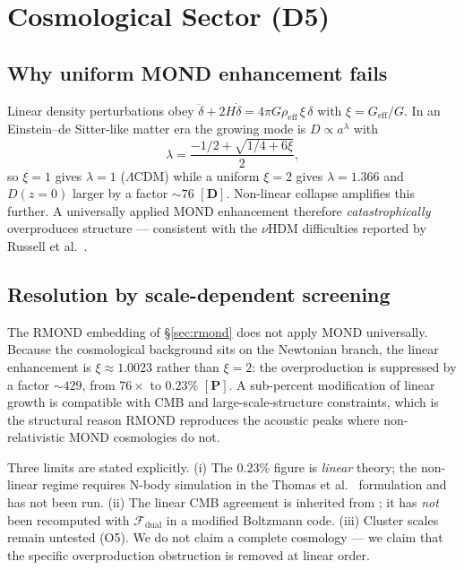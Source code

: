 \documentclass[aps,prd,preprint,superscriptaddress,nofootinbib,amsmath,amssymb,floatfix]{revtex4-2}
\makeatletter
\DeclareRobustCommand{\_}{%
    \ifmmode\nfss@text{\textunderscore}\else\textunderscore\penalty\z@\fi}%
\makeatother
\begin{document}
\section{Cosmological Sector (D5)}
\label{sec:cosmo}

\subsection{Why uniform MOND enhancement fails}

Linear density perturbations obey $\ddot\delta + 2H\dot\delta = 4\pi G\rho_{\text{eff}}\,\xi\,\delta$ with $\xi = G_{\text{eff}}/G$. In an Einstein--de Sitter-like matter era the growing mode is $D\propto a^\lambda$ with
\begin{equation}
\lambda = \frac{-1/2 + \sqrt{1/4 + 6\xi}}{2},
\end{equation}
so $\xi=1$ gives $\lambda=1$ ($\Lambda$CDM) while a uniform $\xi=2$ gives $\lambda=1.366$ and $D(z=0)$ larger by a factor $\sim76$ $\mathbf{[D]}$. Non-linear collapse amplifies this further. A universally applied MOND enhancement therefore \emph{catastrophically} overproduces structure --- consistent with the $\nu$HDM difficulties reported by Russell et al.~\cite{Russell2026}.

\subsection{Resolution by scale-dependent screening}

The RMOND embedding of \S\ref{sec:rmond} does not apply MOND universally. Because the cosmological background sits on the Newtonian branch, the linear enhancement is $\xi \approx 1.0023$ rather than $\xi = 2$: the overproduction is suppressed by a factor $\sim429$, from $76\times$ to $0.23\%$ $\mathbf{[P]}$. A sub-percent modification of linear growth is compatible with CMB and large-scale-structure constraints, which is the structural reason RMOND reproduces the acoustic peaks where non-relativistic MOND cosmologies do not.

\begin{tcolorbox}[colback=boxbg,colframe=primary,title=\textbf{Limits of this result $\mathbf{[O]}$}]
Three limits are stated explicitly. (i) The $0.23\%$ figure is \emph{linear} theory; the non-linear regime requires N-body simulation in the Thomas et al.~\cite{Thomas2023} formulation and has not been run. (ii) The linear CMB agreement is inherited from \cite{SkordisZlosnik2021}; it has \emph{not} been recomputed with $\mathcal{F}_{\text{dual}}$ in a modified Boltzmann code. (iii) Cluster scales remain untested (O5). We do not claim a complete cosmology --- we claim that the specific overproduction obstruction is removed at linear order.
\end{tcolorbox}
\end{document}
